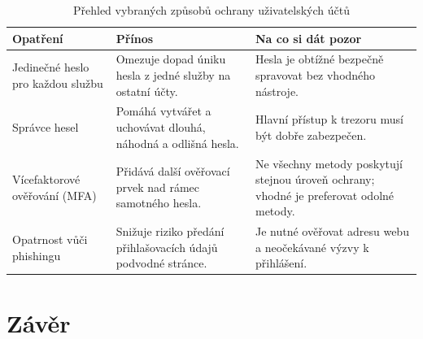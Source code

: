 \begin{table}[ht]
    \centering
    \caption{Přehled vybraných způsobů ochrany uživatelských účtů}
    \label{tab:ochrana}
    \begin{tabular}{p{3.2cm} p{5.0cm} p{5.0cm}}
        \toprule
        \textbf{Opatření} & \textbf{Přínos} & \textbf{Na co si dát pozor} \\
        \midrule
        Jedinečné heslo pro každou službu
        & Omezuje dopad úniku hesla z jedné služby na ostatní účty.
        & Hesla je obtížné bezpečně spravovat bez vhodného nástroje. \\
        \addlinespace
        Správce hesel
        & Pomáhá vytvářet a uchovávat dlouhá, náhodná a odlišná hesla.
        & Hlavní přístup k trezoru musí být dobře zabezpečen. \\
        \addlinespace
        Vícefaktorové ověřování (MFA)
        & Přidává další ověřovací prvek nad rámec samotného hesla.
        & Ne všechny metody poskytují stejnou úroveň ochrany; vhodné je preferovat odolné metody. \\
        \addlinespace
        Opatrnost vůči phishingu
        & Snižuje riziko předání přihlašovacích údajů podvodné stránce.
        & Je nutné ověřovat adresu webu a neočekávané výzvy k přihlášení. \\
        \bottomrule
    \end{tabular}
\end{table}

\section{Závěr}

